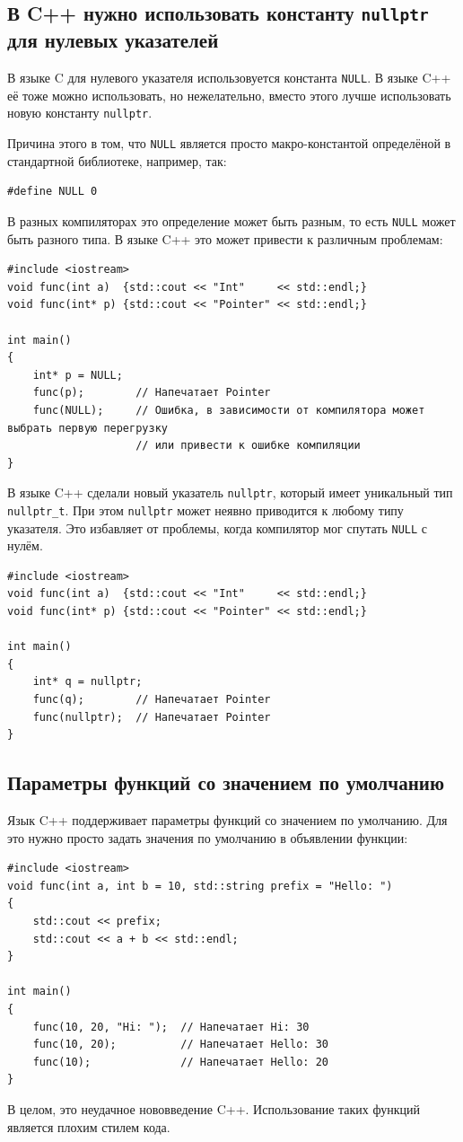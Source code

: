\documentclass{article}
\begin{document}
\subsection*{В C++ нужно использовать константу \texttt{nullptr} для нулевых указателей}
В языке C для нулевого указателя использовуется константа \texttt{NULL}. В языке C++ её тоже можно использовать, но нежелательно, вместо этого лучше использовать новую константу \texttt{nullptr}.

Причина этого в том, что \texttt{NULL} является просто макро-константой определёной в стандартной библиотеке, например, так:
\begin{lstlisting}
#define NULL 0
\end{lstlisting}
В разных компиляторах это определение может быть разным, то есть \texttt{NULL} может быть разного типа.
В языке C++ это может привести к различным проблемам:
\begin{lstlisting}
#include <iostream>
void func(int a)  {std::cout << "Int"     << std::endl;}
void func(int* p) {std::cout << "Pointer" << std::endl;}

int main()
{
    int* p = NULL;
    func(p);        // Напечатает Pointer
    func(NULL);     // Ошибка, в зависимости от компилятора может выбрать первую перегрузку 
                    // или привести к ошибке компиляции
}
\end{lstlisting}
В языке C++ сделали новый указатель \texttt{nullptr}, который имеет уникальный тип \texttt{nullptr\_t}. При этом \texttt{nullptr} может неявно приводится к любому типу указателя. Это избавляет от проблемы, когда компилятор мог спутать \texttt{NULL} с нулём.
\begin{lstlisting}
#include <iostream>
void func(int a)  {std::cout << "Int"     << std::endl;}
void func(int* p) {std::cout << "Pointer" << std::endl;}

int main()
{
    int* q = nullptr;
    func(q);        // Напечатает Pointer
    func(nullptr);  // Напечатает Pointer
}
\end{lstlisting}

\subsection*{Параметры функций со значением по умолчанию}
Язык C++ поддерживает параметры функций со значением по умолчанию. Для это нужно просто задать значения по умолчанию в объявлении функции:
\begin{lstlisting}
#include <iostream>
void func(int a, int b = 10, std::string prefix = "Hello: ")
{
    std::cout << prefix;
    std::cout << a + b << std::endl;
}

int main()
{
    func(10, 20, "Hi: ");  // Напечатает Hi: 30
    func(10, 20);          // Напечатает Hello: 30
    func(10);              // Напечатает Hello: 20
}
\end{lstlisting}
В целом, это неудачное нововведение C++. Использование таких функций является плохим стилем кода. 
\end{document}
